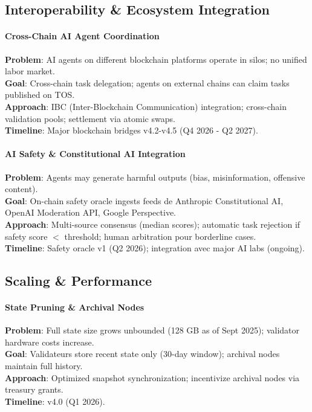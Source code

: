 \documentclass[11pt]{article}
\begin{document}
\subsection{Interoperability \& Ecosystem Integration}

\paragraph{Cross-Chain AI Agent Coordination}
\textbf{Problem}: AI agents on different blockchain platforms operate in silos; no unified labor market.\\
\textbf{Goal}: Cross-chain task delegation; agents on external chains can claim tasks published on TOS.\\
\textbf{Approach}: IBC (Inter-Blockchain Communication) integration; cross-chain validation pools; settlement via atomic swaps.\\
\textbf{Timeline}: Major blockchain bridges v4.2-v4.5 (Q4 2026 - Q2 2027).

\paragraph{AI Safety \& Constitutional AI Integration}
\textbf{Problem}: Agents may generate harmful outputs (bias, misinformation, offensive content).\\
\textbf{Goal}: On-chain safety oracle ingests feeds de Anthropic Constitutional AI, OpenAI Moderation API, Google Perspective.\\
\textbf{Approach}: Multi-source consensus (median scores); automatic task rejection if safety score $<$ threshold; human arbitration pour borderline cases.\\
\textbf{Timeline}: Safety oracle v1 (Q2 2026); integration avec major AI labs (ongoing).

\subsection{Scaling \& Performance}

\paragraph{State Pruning \& Archival Nodes}
\textbf{Problem}: Full state size grows unbounded (128 GB as of Sept 2025); validator hardware costs increase.\\
\textbf{Goal}: Validateurs store recent state only (30-day window); archival nodes maintain full history.\\
\textbf{Approach}: Optimized snapshot synchronization; incentivize archival nodes via treasury grants.\\
\textbf{Timeline}: v4.0 (Q1 2026).
\end{document}
